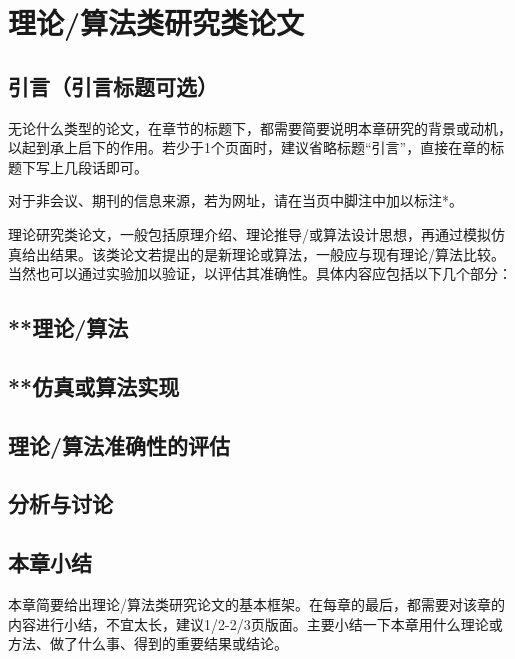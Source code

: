 \chapter{理论/算法类研究类论文}
\label{cha:thirdsection}


\section{引言（引言标题可选）}
\label{sec:method}
无论什么类型的论文，在章节的标题下，都需要简要说明本章研究的背景或动机，以起到承上启下的作用。若少于1个页面时，建议省略标题“引言”，直接在章的标题下写上几段话即可。

对于非会议、期刊的信息来源，若为网址，请在当页中脚注中加以标注*。

理论研究类论文，一般包括原理介绍、理论推导/或算法设计思想，再通过模拟仿真给出结果。该类论文若提出的是新理论或算法，一般应与现有理论/算法比较。当然也可以通过实验加以验证，以评估其准确性。具体内容应包括以下几个部分：



\section{**理论/算法}
\label{sec:algorithm}



\section{**仿真或算法实现}


\section{理论/算法准确性的评估}


\section{分析与讨论}

\section{本章小结}

本章简要给出理论/算法类研究论文的基本框架。在每章的最后，都需要对该章的内容进行小结，不宜太长，建议1/2-2/3页版面。主要小结一下本章用什么理论或方法、做了什么事、得到的重要结果或结论。